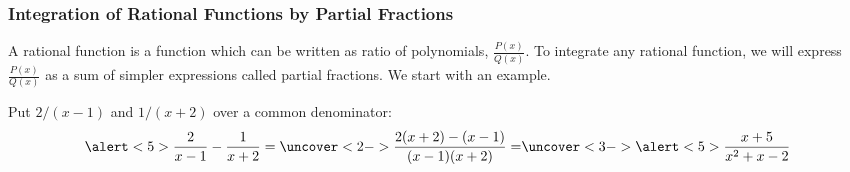 \begin{frame}
\frametitle{Integration of Rational Functions by Partial Fractions}

A rational function is a function which can be written as ratio of polynomials, $\frac{P(x)}{Q(x)}$. To integrate any rational function, we will express $\frac{P(x)}{Q(x)}$ as a sum of simpler expressions called partial fractions. We start with an example. 

Put $2/(x-1)$ and $1/(x+2)$ over a common denominator:
\[
\alert<5>{\frac{2}{x-1} - \frac{1}{x+2} } = %
\uncover<2->{%
\frac{2(x+2) - (x-1)}{(x-1)(x+2)} = %
}%
\uncover<3->{%
\alert<5>{ \frac{x + 5}{x^2+x-2} }%
}%
\]

%

\end{frame}
